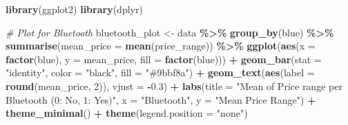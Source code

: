 \documentclass[
]{article}
\newenvironment{Shaded}{\begin{snugshade}}{\end{snugshade}}
\newcommand{\AttributeTok}[1]{\textcolor[rgb]{0.13,0.29,0.53}{#1}}
\newcommand{\CommentTok}[1]{\textcolor[rgb]{0.56,0.35,0.01}{\textit{#1}}}
\newcommand{\DecValTok}[1]{\textcolor[rgb]{0.00,0.00,0.81}{#1}}
\newcommand{\FloatTok}[1]{\textcolor[rgb]{0.00,0.00,0.81}{#1}}
\newcommand{\FunctionTok}[1]{\textcolor[rgb]{0.13,0.29,0.53}{\textbf{#1}}}
\newcommand{\NormalTok}[1]{#1}
\newcommand{\OtherTok}[1]{\textcolor[rgb]{0.56,0.35,0.01}{#1}}
\newcommand{\SpecialCharTok}[1]{\textcolor[rgb]{0.81,0.36,0.00}{\textbf{#1}}}
\newcommand{\StringTok}[1]{\textcolor[rgb]{0.31,0.60,0.02}{#1}}
\begin{document}
\begin{Shaded}
\begin{Highlighting}[]
\FunctionTok{library}\NormalTok{(ggplot2)}
\FunctionTok{library}\NormalTok{(dplyr)}

\CommentTok{\# Plot for Bluetooth}
\NormalTok{bluetooth\_plot }\OtherTok{\textless{}{-}}\NormalTok{ data }\SpecialCharTok{\%\textgreater{}\%}
  \FunctionTok{group\_by}\NormalTok{(blue) }\SpecialCharTok{\%\textgreater{}\%}
  \FunctionTok{summarise}\NormalTok{(}\AttributeTok{mean\_price =} \FunctionTok{mean}\NormalTok{(price\_range)) }\SpecialCharTok{\%\textgreater{}\%}
  \FunctionTok{ggplot}\NormalTok{(}\FunctionTok{aes}\NormalTok{(}\AttributeTok{x =} \FunctionTok{factor}\NormalTok{(blue), }\AttributeTok{y =}\NormalTok{ mean\_price, }\AttributeTok{fill =} \FunctionTok{factor}\NormalTok{(blue))) }\SpecialCharTok{+}
  \FunctionTok{geom\_bar}\NormalTok{(}\AttributeTok{stat =} \StringTok{"identity"}\NormalTok{, }\AttributeTok{color =} \StringTok{"black"}\NormalTok{, }\AttributeTok{fill =} \StringTok{"\#9bbf8a"}\NormalTok{) }\SpecialCharTok{+}
  \FunctionTok{geom\_text}\NormalTok{(}\FunctionTok{aes}\NormalTok{(}\AttributeTok{label =} \FunctionTok{round}\NormalTok{(mean\_price, }\DecValTok{2}\NormalTok{)), }\AttributeTok{vjust =} \SpecialCharTok{{-}}\FloatTok{0.3}\NormalTok{) }\SpecialCharTok{+}
  \FunctionTok{labs}\NormalTok{(}\AttributeTok{title =} \StringTok{"Mean of Price range per Bluetooth (0: No, 1: Yes)"}\NormalTok{, }\AttributeTok{x =} \StringTok{"Bluetooth"}\NormalTok{, }\AttributeTok{y =} \StringTok{"Mean Price Range"}\NormalTok{) }\SpecialCharTok{+}
  \FunctionTok{theme\_minimal}\NormalTok{() }\SpecialCharTok{+}
  \FunctionTok{theme}\NormalTok{(}\AttributeTok{legend.position =} \StringTok{"none"}\NormalTok{)}


\end{Highlighting}
\end{Shaded}
\end{document}
